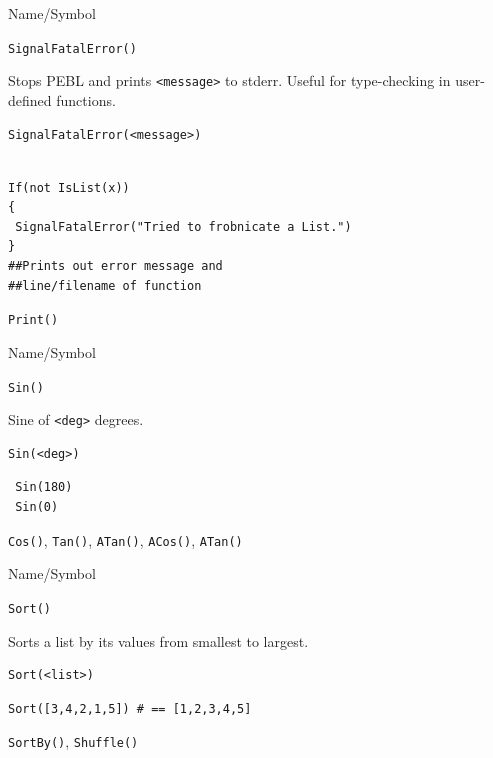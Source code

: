 \begin{desc}{Name/Symbol}
\item[Name/Symbol] 	\verb+SignalFatalError()+

\item[Description] Stops PEBL and prints \verb+<message>+ to stderr.
  Useful for type-checking in user-defined functions.

\item[Usage]
\begin{verbatim}
SignalFatalError(<message>)
\end{verbatim}
\item[Example]
\begin{verbatim}

If(not IsList(x))
{
 SignalFatalError("Tried to frobnicate a List.")
}
##Prints out error message and 
##line/filename of function
\end{verbatim}

\item[See Also]     	\verb+Print()+
\end{desc}

\begin{desc}{Name/Symbol}
\item[Name/Symbol]  	\verb+Sin()+

\item[Description]  	Sine of \verb+<deg>+ degrees.

\item[Usage]        	
\begin{verbatim}
Sin(<deg>)
\end{verbatim}
\item[Example]
\begin{verbatim}
 Sin(180)
 Sin(0)
\end{verbatim}
\item[See Also]    	\verb+Cos()+, \verb+Tan()+, \verb+ATan()+, \verb+ACos()+, \verb+ATan()+ 
\end{desc}

\begin{desc}{Name/Symbol}
\item[Name/Symbol] 	\verb+Sort()+

\item[Description] 	Sorts a list by its values from smallest to largest.

\item[Usage]       	
\begin{verbatim}
Sort(<list>)
\end{verbatim}

\item[Example]
\begin{verbatim}
Sort([3,4,2,1,5]) # == [1,2,3,4,5]
\end{verbatim}

\item[See Also]    	\verb+SortBy()+, \verb+Shuffle()+
\end{desc}

